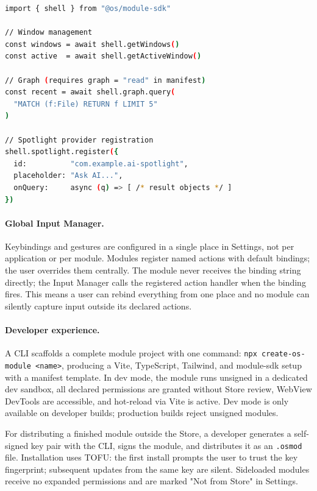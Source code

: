 \begin{lstlisting}[language=bash, caption={Module SDK surface (TypeScript)}]
import { shell } from "@os/module-sdk"

// Window management
const windows = await shell.getWindows()
const active  = await shell.getActiveWindow()

// Graph (requires graph = "read" in manifest)
const recent = await shell.graph.query(
  "MATCH (f:File) RETURN f LIMIT 5"
)

// Spotlight provider registration
shell.spotlight.register({
  id:          "com.example.ai-spotlight",
  placeholder: "Ask AI...",
  onQuery:     async (q) => [ /* result objects */ ]
})
\end{lstlisting}

\paragraph{Global Input Manager.}
Keybindings and gestures are configured in a single place in Settings, not per
application or per module. Modules register named actions with default
bindings; the user overrides them centrally. The module never receives the
binding string directly; the Input Manager calls the registered action handler
when the binding fires. This means a user can rebind everything from one place
and no module can silently capture input outside its declared actions.

\paragraph{Developer experience.}
A CLI scaffolds a complete module project with one command:
\texttt{npx create-os-module <name>}, producing a Vite, TypeScript, Tailwind,
and module-sdk setup with a manifest template. In dev mode, the module runs
unsigned in a dedicated dev sandbox, all declared permissions are granted
without Store review, WebView DevTools are accessible, and hot-reload via Vite
is active. Dev mode is only available on developer builds; production builds
reject unsigned modules.

For distributing a finished module outside the Store, a developer generates a
self-signed key pair with the CLI, signs the module, and distributes it as an
\texttt{.osmod} file. Installation uses TOFU: the first install prompts the
user to trust the key fingerprint; subsequent updates from the same key are
silent. Sideloaded modules receive no expanded permissions and are marked
"Not from Store" in Settings.

